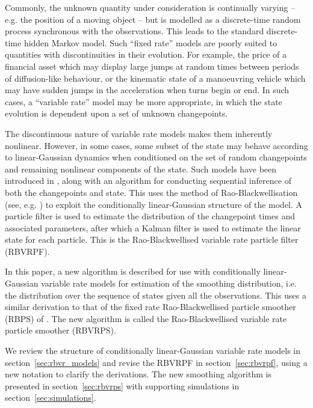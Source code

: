 \documentclass[journal]{IEEEtran}
\begin{document}
Commonly, the unknown quantity under consideration is continually varying -- e.g. the position of a moving object -- but is modelled as a discrete-time random process synchronous with the observations. This leads to the standard discrete-time hidden Markov model. Such ``fixed rate'' models are poorly suited to quantities with discontinuities in their evolution. For example, the price of a financial asset which may display large jumps at random times between periods of diffusion-like behaviour, or the kinematic state of a manoeuvring vehicle which may have sudden jumps in the acceleration when turns begin or end. In such cases, a ``variable rate'' model may be more appropriate, in which the state evolution is dependent upon a set of unknown changepoints.

The discontinuous nature of variable rate models makes them inherently nonlinear. However, in some cases, some subset of the state may behave according to linear-Gaussian dynamics when conditioned on the set of random changepoints and remaining nonlinear components of the state. Such models have been introduced in \cite{Godsill2007a,Christensen2012}, along with an algorithm for conducting sequential inference of both the changepoints and state. This uses the method of Rao-Blackwellisation (see, e.g. \cite{Casella1996,Doucet2000}) to exploit the conditionally linear-Gaussian structure of the model. A particle filter is used to estimate the distribution of the changepoint times and associated parameters, after which a Kalman filter is used to estimate the linear state for each particle. This is the Rao-Blackwellised variable rate particle filter (RBVRPF).

In this paper, a new algorithm is described for use with conditionally linear-Gaussian variable rate models for estimation of the smoothing distribution, i.e. the distribution over the sequence of states given all the observations. This uses a similar derivation to that of the fixed rate Rao-Blackwellised particle smoother (RBPS) of \cite{Sarkka2012}. The new algorithm is called the Rao-Blackwellised variable rate particle smoother (RBVRPS).

We review the structure of conditionally linear-Gaussian variable rate models in section~\ref{sec:rbvr_models} and revise the RBVRPF in section~\ref{sec:rbvrpf}, using a new notation to clarify the derivations. The new smoothing algorithm is presented in section~\ref{sec:rbvrps} with supporting simulations in section~\ref{sec:simulations}.
\end{document}
